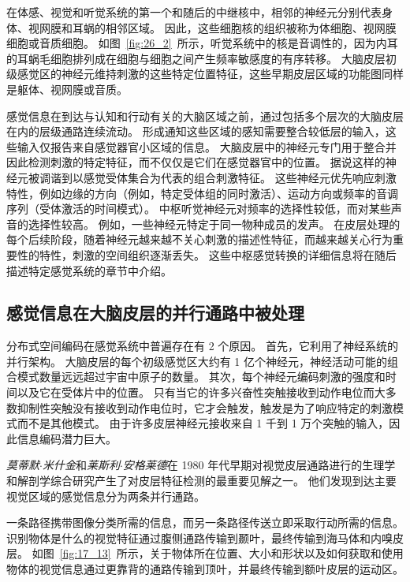 在体感、视觉和听觉系统的第一个和随后的中继核中，相邻的神经元分别代表身体、视网膜和耳蜗的相邻区域。 
因此，这些细胞核的组织被称为体细胞、视网膜细胞或音质细胞。 
如图~\ref{fig:26_2}~所示，听觉系统中的核是音调性的，因为内耳的耳蜗毛细胞排列成在细胞与细胞之间产生频率敏感度的有序转移。
大脑皮层初级感觉区的神经元维持刺激的这些特定位置特征，这些早期皮层区域的功能图同样是躯体、视网膜或音质。


感觉信息在到达与认知和行动有关的大脑区域之前，通过包括多个层次的大脑皮层在内的层级通路连续流动。
形成通知这些区域的感知需要整合较低层的输入，这些输入仅报告来自感觉器官小区域的信息。
大脑皮层中的神经元专门用于整合并因此检测刺激的特定特征，而不仅仅是它们在感觉器官中的位置。
据说这样的神经元被调谐到以感觉受体集合为代表的组合刺激特征。
这些神经元优先响应刺激特性，例如边缘的方向（例如，特定受体组的同时激活）、运动方向或频率的音调序列（受体激活的时间模式）。
中枢听觉神经元对频率的选择性较低，而对某些声音的选择性较高。
例如，一些神经元特定于同一物种成员的发声。
在皮层处理的每个后续阶段，随着神经元越来越不关心刺激的描述性特征，而越来越关心行为重要性的特性，刺激的空间组织逐渐丢失。
这些中枢感觉转换的详细信息将在随后描述特定感觉系统的章节中介绍。



\subsection{感觉信息在大脑皮层的并行通路中被处理}

分布式空间编码在感觉系统中普遍存在有 2 个原因。
首先，它利用了神经系统的并行架构。
大脑皮层的每个初级感觉区大约有 1 亿个神经元，神经活动可能的组合模式数量远远超过宇宙中原子的数量。
其次，每个神经元编码刺激的强度和时间以及它在受体片中的位置。
只有当它的许多兴奋性突触接收到动作电位而大多数抑制性突触没有接收到动作电位时，它才会触发，触发是为了响应特定的刺激模式而不是其他模式。
由于许多皮层神经元接收来自 1 千到 1 万个突触的输入，因此信息编码潜力巨大。


\textit{莫蒂默$\cdot$米什金}和\textit{莱斯利$\cdot$安格莱德}在 1980 年代早期对视觉皮层通路进行的生理学和解剖学综合研究产生了对皮层特征检测的最重要见解之一。
他们发现到达主要视觉区域的感觉信息分为两条并行通路。


一条路径携带图像分类所需的信息，而另一条路径传送立即采取行动所需的信息。
识别物体是什么的视觉特征通过腹侧通路传输到颞叶，最终传输到海马体和内嗅皮层。 
如图~\ref{fig:17_13}~所示，关于物体所在位置、大小和形状以及如何获取和使用物体的视觉信息通过更靠背的通路传输到顶叶，并最终传输到额叶皮层的运动区。


